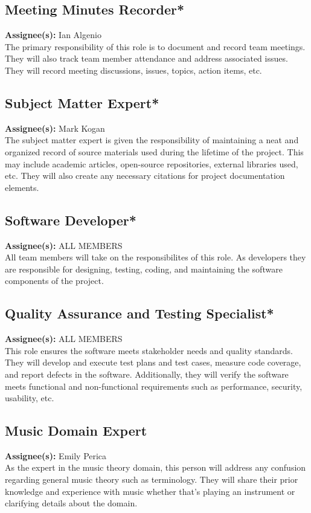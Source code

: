 \documentclass{article}
\begin{document}
\subsection{Meeting Minutes Recorder*}
\textbf{Assignee(s):} Ian Algenio\\
The primary responsibility of this role is to document and record team meetings. They will also track team member attendance
and address associated issues. They will record meeting discussions, issues, topics, action items, etc.
\subsection{Subject Matter Expert*}
\textbf{Assignee(s):} Mark Kogan\\
The subject matter expert is given the responsibility of maintaining a neat and organized record of source materials used 
during the lifetime of the project. This may include academic articles, open-source repositories, external libraries used, etc. 
They will also create any necessary citations for project documentation elements.
\subsection{Software Developer*}
\textbf{Assignee(s):} ALL MEMBERS\\
All team members will take on the responsibilites of this role. As developers they are responsible for designing,
testing, coding, and maintaining the software components of the project.
\subsection{Quality Assurance and Testing Specialist*}
\textbf{Assignee(s):} ALL MEMBERS\\
This role ensures the software meets stakeholder needs and quality standards. They will develop and
execute test plans and test cases, measure code coverage, and report defects in the software. Additionally,
they will verify the software meets functional and non-functional requirements such as performance, security, usability, etc.

\subsection{Music Domain Expert}
\textbf{Assignee(s):} Emily Perica\\
As the expert in the music theory domain, this person will address any confusion regarding general music theory such as terminology. They will
share their prior knowledge and experience with music whether that's playing an instrument or clarifying details about the domain.\\
\end{document}
